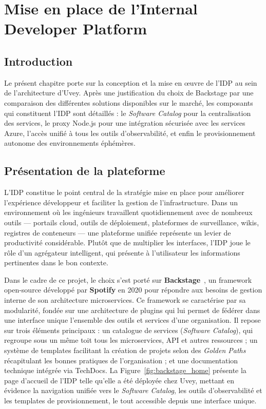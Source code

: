 \chapter{Mise en place de l'Internal Developer Platform}
\label{chap:idp}

\section*{Introduction}

Le présent chapitre porte sur la conception et la mise en œuvre de l'\ac{IDP} au sein de l'architecture d'Uvey. Après une justification du choix de Backstage par une comparaison des différentes solutions disponibles sur le marché, les composants qui constituent l'\ac{IDP} sont détaillés : le \textit{Software Catalog} pour la centralisation des services, le proxy Node.js pour une intégration sécurisée avec les services Azure, l'accès unifié à tous les outils d'observabilité, et enfin le provisionnement autonome des environnements éphémères.

\section{Présentation de la plateforme}
\label{sec:idp_presentation}

L'\ac{IDP} constitue le point central de la stratégie mise en place pour améliorer l'expérience développeur et faciliter la gestion de l'infrastructure. Dans un environnement où les ingénieurs travaillent quotidiennement avec de nombreux outils --- portails cloud, outils de déploiement, plateformes de surveillance, wikis, registres de conteneurs --- une plateforme unifiée représente un levier de productivité considérable. Plutôt que de multiplier les interfaces, l'\ac{IDP} joue le rôle d'un agrégateur intelligent, qui présente à l'utilisateur les informations pertinentes dans le bon contexte.

Dans le cadre de ce projet, le choix s'est porté sur \textbf{Backstage}~\cite{backstage2023docs}, un framework open-source développé par \textbf{Spotify} en 2020 pour répondre aux besoins de gestion interne de son architecture microservices. Ce framework se caractérise par sa modularité, fondée sur une architecture de plugins qui lui permet de fédérer dans une interface unique l'ensemble des outils et services d'une organisation. Il repose sur trois éléments principaux : un catalogue de services (\textit{Software Catalog}), qui regroupe sous un même toit tous les microservices, \ac{API} et autres ressources ; un système de templates facilitant la création de projets selon des \textit{Golden Paths} récapitulant les bonnes pratiques de l'organisation ; et une documentation technique intégrée via TechDocs. La Figure~\ref{fig:backstage_home} présente la page d'accueil de l'\ac{IDP} telle qu'elle a été déployée chez Uvey, mettant en évidence la navigation unifiée vers le \textit{Software Catalog}, les outils d'observabilité et les templates de provisionnement, le tout accessible depuis une interface unique.

